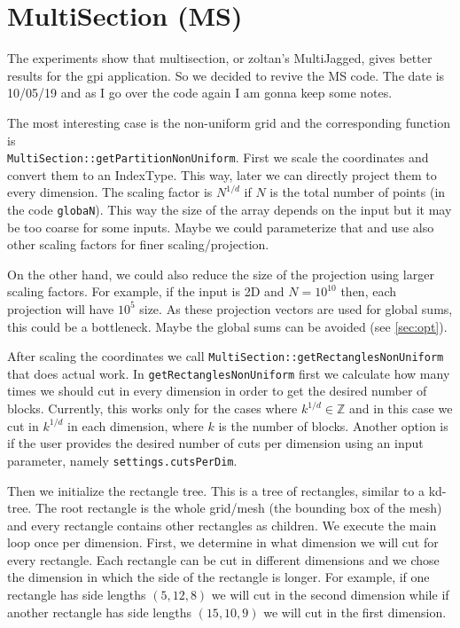 \documentclass[a4paper,10pt]{article}
\author{Harry Tzovas}
\newcommand{\blue}[1]{{\color{blue1}{#1}}}
\begin{document}
\section{MultiSection (MS)}

The experiments show that multisection, or zoltan's MultiJagged, gives better results for the gpi
application. So we decided to revive the MS code. The date is 10/05/19 and as I go over the code
again I am gonna keep some notes.

\blue{*** See also the files monthly\_report\_17\_05, 03\_07 and 03\_08 in folder 
$\sim$/ResearchReports-CT/monthly\_reports }

The most interesting case is the non-uniform grid and the corresponding function is \\
\texttt{MultiSection::getPartitionNonUniform}. First we scale the coordinates and convert them to
an IndexType. This way, later we can directly project them to every dimension. The scaling factor
is $N^{1/d}$ if $N$ is the total number of points (in the code \texttt{globaN}). This way the
size of the array depends on the input but it may be too coarse for some inputs. Maybe we could
parameterize that and use also other scaling factors for finer scaling/projection.

On the other hand, we could also reduce the size of the projection using larger scaling factors.
For example, if the input is 2D and $N=10^10$ then, each projection will have $10^5$ size. 
As these projection vectors are used for global sums, this could be a bottleneck.
Maybe the global sums can be avoided (see \cref{sec:opt}). 

After scaling the coordinates we call \texttt{MultiSection::getRectanglesNonUniform} that does
actual work. In \texttt{getRectanglesNonUniform} first we calculate how many times we should
cut in every dimension in order to get the desired number of blocks. Currently, this works
only for the cases where $k^{1/d}\in \mathbb{Z}$ and in this case we cut in $k^{1/d}$ in each
dimension, where $k$ is the number of blocks. Another option is if the user provides the
desired number of cuts per dimension using an input parameter, namely \texttt{settings.cutsPerDim}.

Then we initialize the rectangle tree. This is a tree of rectangles, similar to a kd-tree. The 
root rectangle is the whole grid/mesh (the bounding box of the mesh) and every rectangle 
contains other rectangles as children. We execute the main loop once per dimension. First, we
determine in what dimension we will cut for every rectangle. Each rectangle can be cut in different
dimensions and we chose the dimension in which the side of the rectangle is longer. For example,
if one rectangle has side lengths $(5,12,8)$ we will cut in the second dimension while if another
rectangle has side lengths $(15,10,9)$ we will cut in the first dimension.
\end{document}
